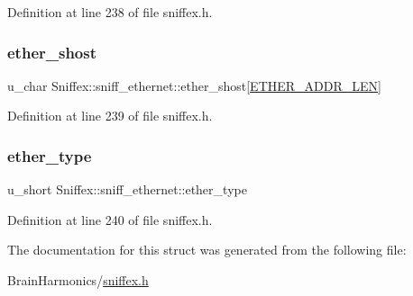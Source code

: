 Definition at line 238 of file sniffex.\+h.

\mbox{\label{struct_sniffex_1_1sniff__ethernet_af40407403f51872c064c28298441b2d9}} 
\subsubsection{\texorpdfstring{ether\+\_\+shost}{ether\_shost}}
{\footnotesize\ttfamily u\+\_\+char Sniffex\+::sniff\+\_\+ethernet\+::ether\+\_\+shost\mbox{[}\mbox{\hyperlink{sniffex_8h_abf4fcaacb1ad2010711b7c880ec2ed20}{E\+T\+H\+E\+R\+\_\+\+A\+D\+D\+R\+\_\+\+L\+EN}}\mbox{]}}



Definition at line 239 of file sniffex.\+h.

\mbox{\label{struct_sniffex_1_1sniff__ethernet_a31b8a8e9232feffeeb747f949580753a}} 
\subsubsection{\texorpdfstring{ether\+\_\+type}{ether\_type}}
{\footnotesize\ttfamily u\+\_\+short Sniffex\+::sniff\+\_\+ethernet\+::ether\+\_\+type}



Definition at line 240 of file sniffex.\+h.



The documentation for this struct was generated from the following file\+:\begin{DoxyCompactItemize}
\item 
Brain\+Harmonics/\mbox{\hyperlink{sniffex_8h}{sniffex.\+h}}\end{DoxyCompactItemize}
